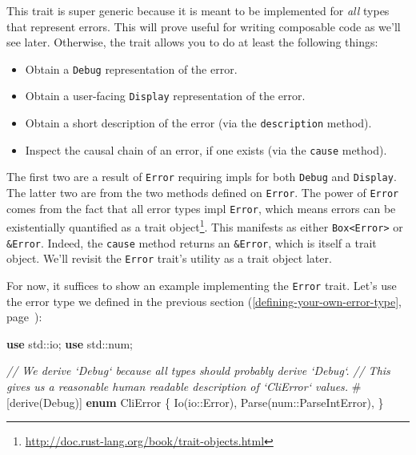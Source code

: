 \documentclass[a4paper,]{book}
\renewcommand*{\hyperref}[2][\ar]{%
  \def\ar{#2}%
  #2 (\autoref{#1}, page~\pageref{#1})}
\newenvironment{Shaded}{\begin{snugshade}}{\end{snugshade}}
\newcommand{\KeywordTok}[1]{\textcolor[rgb]{0.13,0.29,0.53}{\textbf{{#1}}}}
\newcommand{\CommentTok}[1]{\textcolor[rgb]{0.56,0.35,0.01}{\textit{{#1}}}}
\newcommand{\OtherTok}[1]{\textcolor[rgb]{0.56,0.35,0.01}{{#1}}}
\newcommand{\NormalTok}[1]{{#1}}
\renewcommand{\href}[2]{#2\footnote{\url{#1}}}
\begin{document}
This trait is super generic because it is meant to be implemented for
\emph{all} types that represent errors. This will prove useful for
writing composable code as we'll see later. Otherwise, the trait allows
you to do at least the following things:

\begin{itemize}
\itemsep1pt\parskip0pt
\item
  Obtain a \texttt{Debug} representation of the error.
\item
  Obtain a user-facing \texttt{Display} representation of the error.
\item
  Obtain a short description of the error (via the \texttt{description}
  method).
\item
  Inspect the causal chain of an error, if one exists (via the
  \texttt{cause} method).
\end{itemize}

The first two are a result of \texttt{Error} requiring impls for both
\texttt{Debug} and \texttt{Display}. The latter two are from the two
methods defined on \texttt{Error}. The power of \texttt{Error} comes
from the fact that all error types impl \texttt{Error}, which means
errors can be existentially quantified as a
\href{http://doc.rust-lang.org/book/trait-objects.html}{trait object}.
This manifests as either \texttt{Box\textless{}Error\textgreater{}} or
\texttt{\&Error}. Indeed, the \texttt{cause} method returns an
\texttt{\&Error}, which is itself a trait object. We'll revisit the
\texttt{Error} trait's utility as a trait object later.

For now, it suffices to show an example implementing the \texttt{Error}
trait. Let's use the error type we defined in the
\hyperref[defining-your-own-error-type]{previous section}:

\begin{Shaded}
\begin{Highlighting}[]
\KeywordTok{use} \NormalTok{std::io;}
\KeywordTok{use} \NormalTok{std::num;}

\CommentTok{// We derive `Debug` because all types should probably derive `Debug`.}
\CommentTok{// This gives us a reasonable human readable description of `CliError` values.}
\OtherTok{#[}\NormalTok{derive}\OtherTok{(}\NormalTok{Debug}\OtherTok{)]}
\KeywordTok{enum} \NormalTok{CliError \{}
    \NormalTok{Io(io::Error),}
    \NormalTok{Parse(num::ParseIntError),}
\NormalTok{\}}
\end{Highlighting}
\end{Shaded}
\end{document}
